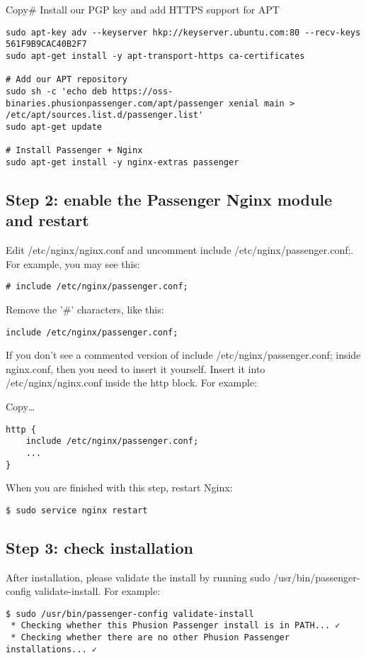 \documentclass[11pt]{article}
\begin{document}
Copy\# Install our PGP key and add HTTPS support for APT
\begin{verbatim}
sudo apt-key adv --keyserver hkp://keyserver.ubuntu.com:80 --recv-keys 561F9B9CAC40B2F7
sudo apt-get install -y apt-transport-https ca-certificates

# Add our APT repository
sudo sh -c 'echo deb https://oss-binaries.phusionpassenger.com/apt/passenger xenial main > /etc/apt/sources.list.d/passenger.list'
sudo apt-get update

# Install Passenger + Nginx
sudo apt-get install -y nginx-extras passenger
\end{verbatim}
\subsection{Step 2: enable the Passenger Nginx module and restart}
\label{sec:org60e78b3}
Edit /etc/nginx/nginx.conf and uncomment include /etc/nginx/passenger.conf;. For example, you may see this:
\begin{verbatim}
# include /etc/nginx/passenger.conf;
\end{verbatim}

Remove the '\#' characters, like this:
\begin{verbatim}
include /etc/nginx/passenger.conf;
\end{verbatim}
If you don't see a commented version of include /etc/nginx/passenger.conf; inside nginx.conf, then you need to insert it yourself. Insert it into /etc/nginx/nginx.conf inside the http block. For example:

Copy\ldots{}
\begin{verbatim}
http {
    include /etc/nginx/passenger.conf;
    ...
}
\end{verbatim}
When you are finished with this step, restart Nginx:
\begin{verbatim}
$ sudo service nginx restart
\end{verbatim}
\subsection{Step 3: check installation}
\label{sec:orgc82e2ce}

After installation, please validate the install by running sudo /usr/bin/passenger-config validate-install. For example:
\begin{verbatim}
$ sudo /usr/bin/passenger-config validate-install
 * Checking whether this Phusion Passenger install is in PATH... ✓
 * Checking whether there are no other Phusion Passenger installations... ✓
\end{verbatim}
\end{document}
